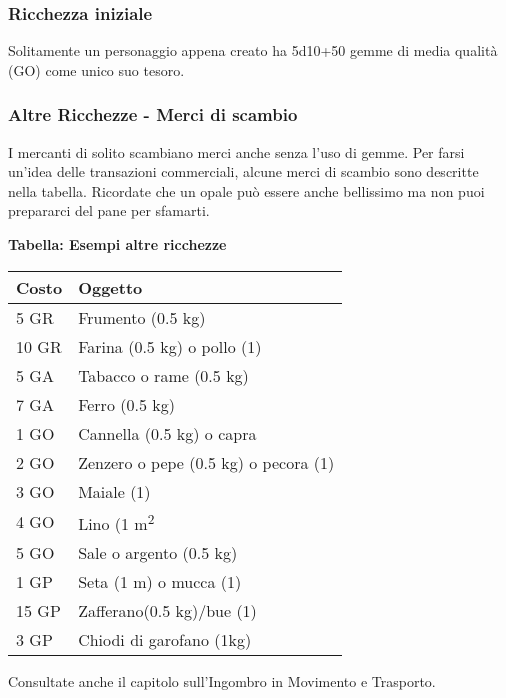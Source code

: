 \documentclass[12pt,a4paper,twoside,openany]{book}
\begin{document}
\bigskip

\begin{multicols}{2}

\subsubsection{Ricchezza iniziale}

Solitamente un personaggio appena creato ha 5d10+50 gemme di media qualità (GO) come unico suo tesoro.

\subsubsection{Altre Ricchezze - Merci di scambio}

I mercanti di solito scambiano merci anche senza l'uso di gemme.
Per farsi un'idea delle transazioni commerciali, alcune merci di scambio sono descritte nella tabella. Ricordate che un opale può essere anche bellissimo ma non puoi prepararci del pane per sfamarti.

\medskip

\textbf{Tabella: Esempi altre ricchezze}

\medskip


\begin{tabular}{ll}
\textbf{Costo} & \textbf{Oggetto}\\
\toprule
5 GR & Frumento (0.5 kg)\\
10 GR & Farina (0.5 kg) o pollo (1)\\
5 GA & Tabacco o rame (0.5 kg)\\
7 GA & Ferro (0.5 kg)\\
1 GO & Cannella (0.5 kg) o capra \\
2 GO & Zenzero o pepe (0.5 kg) o pecora (1)\\
3 GO & Maiale (1) \\
4 GO & Lino (1 m\textsuperscript{2}\\
5 GO & Sale o argento (0.5 kg) \\
1 GP& Seta (1 m) o mucca (1)\\
15 GP& Zafferano(0.5 kg)/bue (1)\\
3 GP&Chiodi di garofano (1kg)\\
\end{tabular}

\medskip

Consultate anche il capitolo sull'Ingombro in Movimento e Trasporto.

\end{multicols}
\end{document}
